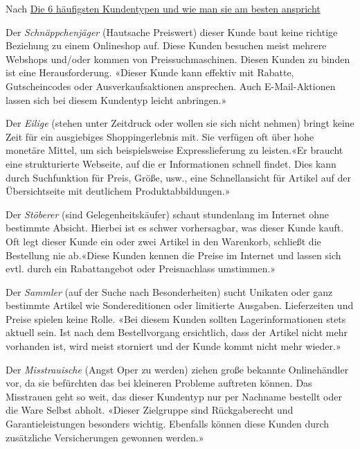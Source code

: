 Nach \href{https://www.businessinsider.de/gruenderszene/allgemein/kundentypen-comarch}{Die 6 häufigsten Kundentypen und wie man sie am besten anspricht}\vspace{0.2cm}

Der \textit{Schnäppchenjäger} (Hautsache Preiswert) dieser Kunde baut keine richtige Beziehung  zu einem Onlineshop auf. Diese Kunden besuchen meist mehrere Webshops und/oder kommen von Preissuchmaschinen. Diesen Kunden zu binden ist eine Herausforderung. «Dieser Kunde kann effektiv mit Rabatte, Gutscheincodes oder Ausverkaufsaktionen ansprechen. Auch E-Mail-Aktionen lassen sich bei diesem Kundentyp leicht anbringen.»\vspace{0.2cm}

Der \textit{Eilige} (stehen unter Zeitdruck oder wollen sie sich nicht nehmen) bringt keine Zeit für ein ausgiebiges Shoppingerlebnis mit. Sie verfügen oft über hohe monetäre Mittel, um sich beispielsweise Expresslieferung zu leisten.«Er braucht eine strukturierte Webseite, auf die er Informationen schnell findet. Dies kann durch Suchfunktion für Preis, Größe, usw., eine Schnellansicht für Artikel auf der Übersichtseite mit deutlichem Produktabbildungen.»\vspace{0.2cm}

Der \textit{Stöberer} (sind Gelegenheitskäufer) schaut stundenlang im Internet ohne bestimmte Absicht. Hierbei ist es schwer vorhersagbar, was dieser Kunde kauft. Oft legt dieser Kunde ein oder zwei Artikel in den Warenkorb, schließt die Bestellung nie ab.«Diese Kunden kennen die Preise im Internet und lassen sich evtl. durch ein Rabattangebot oder Preisnachlass umstimmen.»\vspace{0.2cm}

Der \textit{Sammler} (auf der Suche nach Besonderheiten) sucht Unikaten oder ganz bestimmte Artikel wie Sondereditionen oder limitierte Ausgaben. Lieferzeiten und Preise spielen keine Rolle. «Bei diesem Kunden sollten Lagerinformationen stets aktuell sein. Ist nach dem Bestellvorgang ersichtlich, dass der Artikel nicht mehr vorhanden ist, wird meist storniert und der Kunde kommt nicht mehr wieder.»\vspace{0.2cm}

Der \textit{Misstrauische} (Angst Oper zu werden) ziehen große bekannte Onlinehändler vor, da sie befürchten das bei kleineren Probleme auftreten können. Das Misstrauen geht so weit, das dieser Kundentyp nur per Nachname bestellt oder die Ware Selbst abholt. «Dieser Zielgruppe sind Rückgaberecht und Garantieleistungen besonders wichtig. Ebenfalls können diese Kunden durch zusätzliche Versicherungen gewonnen werden.»\vspace{0.2cm}


